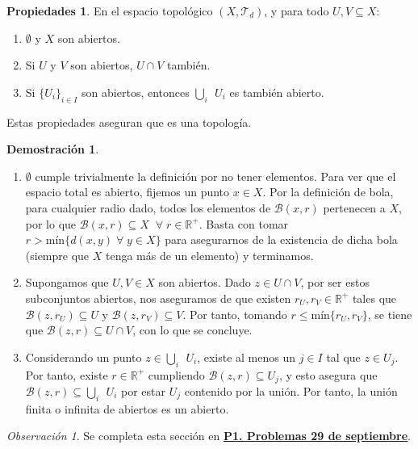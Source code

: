 \documentclass[12pt,twoside]{report}
\newcommand\mc[1]{\mathcal{#1}}
\theoremstyle{azul}
\theoremstyle{azul2}
\theoremstyle{plain}
\theoremstyle{definition}
\newtheorem*{propi}{Propiedades}
\newtheorem*{dem}{Demostración}
\theoremstyle{remark}
\newtheorem*{obs}{Observación}
\begin{document}
\begin{propi} \: En el espacio topológico $(X,\mc{T}_d)$, y para todo $U, V \subseteq X$:\vspace{-3mm}
\begin{enumerate} 
    \item $\emptyset$ y $X$ son abiertos.
    \item Si $U$ y $V$ son abiertos, $U \cap V$ tambi{\'e}n.
    \item Si $\{ U_i \}_{i \in I}$ son abiertos, entonces $\underset{i}\bigcup \: \: U_i$ es tambi{\'e}n abierto.
\end{enumerate}
Estas propiedades aseguran que es una topología.
\end{propi}
\begin{dem}\: \vspace{-5mm}
\begin{enumerate}
    \item $\emptyset$ cumple trivialmente la definición por no tener elementos. Para ver que el espacio total es abierto, fijemos un punto $x \in X$. Por la definición de bola, para cualquier radio dado, todos los elementos de $\mc{B}(x,r)$ pertenecen a $X$, por lo que $\mc{B}(x,r) \subseteq X\;\; \forall \; r \in \mathbb{R}^+$. Basta con tomar $r > \text{mín}\{d(x,y) \;\forall \; y \in X\}$ para asegurarnos de la existencia de dicha bola (siempre que $X$ tenga más de un elemento) y terminamos.
    \item Supongamos que $U, V \in X$ son abiertos. Dado $z \in U \cap V$, por ser estos subconjuntos abiertos, nos aseguramos de que existen $r_U, r_V \in \mathbb{R}^+$ tales que $\mc{B}(z,r_U) \subseteq U$ y $\mc{B}(z,r_V) \subseteq V$. Por tanto, tomando $r \leq \text{mín}\{r_U,r_V\}$, se tiene que $\mc{B}(z,r) \subseteq U \cap V$, con lo que se concluye.
    \item Considerando un punto $z \in \underset{i}\bigcup \: \: U_i$, existe al menos un $j \in I$ tal que $z \in U_j$. Por tanto, existe $r \in \mathbb{R}^+$ cumpliendo $\mc{B}(z,r) \subseteq U_j$, y esto asegura que $\mc{B}(z,r) \subseteq \underset{i}\bigcup \: \: U_i$ por estar $U_j$ contenido por la unión. Por tanto, la unión finita o infinita de abiertos es un abierto.
\end{enumerate}
\end{dem}


\begin{obs}
Se completa esta sección en \textcolor{blue}{\textbf{\hyperref[P1]{P1. Problemas 29 de septiembre}}}.
\end{obs}
\end{document}
